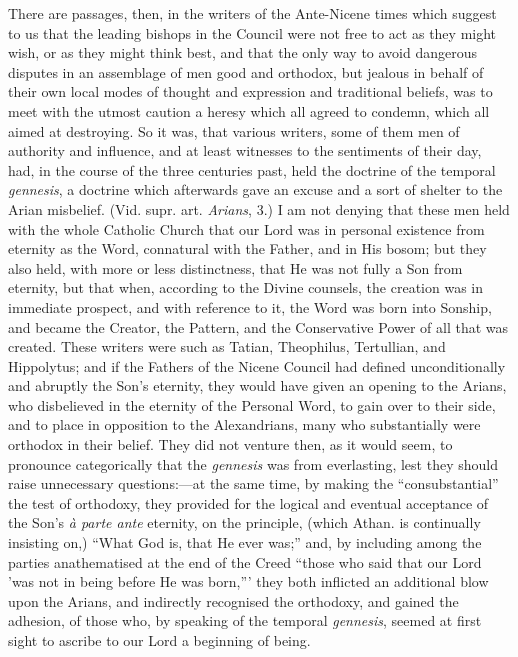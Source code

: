 There
are passages, then, in the writers of the Ante-Nicene times which
suggest to us that the leading bishops in the Council were not free to
act as they might wish, or as they might think best, and that the only
way to avoid dangerous disputes in an assemblage of men good and
orthodox, but jealous in behalf of their own local modes of thought
and expression and traditional beliefs, was to meet with the utmost
caution a heresy which all agreed to condemn, which all aimed at
destroying. So it was, that various writers, some of them men of
authority and influence, and at least witnesses to the sentiments of
their day, had, in the course of the three centuries past, held the
doctrine of the temporal \emph{gennesis}, a doctrine which afterwards
gave an excuse and a sort of shelter to the Arian misbelief. (Vid.
supr. art. \emph{Arians}, 3.) I am not denying that these men held
with the whole Catholic Church that our Lord was in personal existence
from eternity as the Word, connatural with the Father, and in His
bosom; but they also held, with more or less distinctness, that He was
not fully a Son from eternity, but that when, according to the Divine
counsels, the creation was in immediate prospect, and with reference
to it, the Word was born into Sonship, and became the Creator, the
Pattern, and the Conservative Power of all that was created.
These writers were such as Tatian, Theophilus, Tertullian, and
Hippolytus; and if the Fathers of the Nicene Council had defined
unconditionally and abruptly the Son's eternity, they would have given
an opening to the Arians, who disbelieved in the eternity of the
Personal Word, to gain over to their side, and to place in opposition
to the Alexandrians, many who substantially were orthodox in their
belief. They did not venture then, as it would seem, to pronounce
categorically that the \emph{gennesis} was from everlasting, lest they
should raise unnecessary questions:—at the same time, by making the ``consubstantial''
the test of orthodoxy, they provided for the logical and eventual
acceptance of the Son's \emph{à parte ante} eternity, on the
principle, (which Athan. is continually insisting on,) ``What God is,
that He ever was;'' and, by including among the parties anathematised
at the end of the Creed ``those who said that our Lord 'was not in
being before He was born,''' they both inflicted an additional blow
upon the Arians, and indirectly recognised the orthodoxy, and gained
the adhesion, of those who, by speaking of the temporal \emph{gennesis},
seemed at first sight to ascribe to our Lord a beginning of being.


